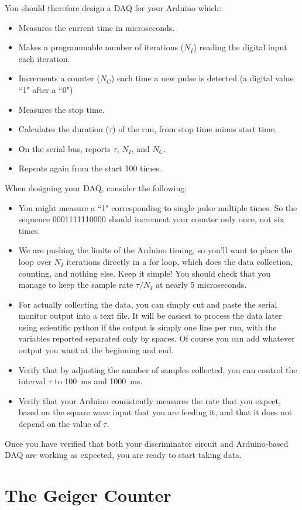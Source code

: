 \documentclass[12pt]{article}
\begin{document}
You should therefore design a DAQ for your Arduino which:
\begin{itemize}
\item Measures the current time in microseconds.
\item Makes a programmable number of iterations ($N_I$) reading the digital input each iteration.
\item Increments a counter ($N_C$) each time a new pulse is detected (a digital value ``1" after a ``0")
\item Measures the stop time.
\item Calculates the duration ($\tau$) of the run, from stop time minus start time.
\item On the serial bus, reports $\tau$, $N_I$, and $N_C$.
\item Repeats again from the start 100 times.
\end{itemize}
When designing your DAQ, consider the following:
\begin{itemize}
\item You might measure a ``1" corresponding to single pulse multiple times.  So the sequence 0001111110000 should increment your counter only once, not six times.
\item We are pushing the limits of the Arduino timing, so you'll want to place the loop over $N_I$ iterations directly in a for loop, which does the data collection, counting, and nothing else.  Keep it simple!  You should check that you manage to keep the sample rate $\tau / N_I$ at nearly 5 microseconds.
\item For actually collecting the data, you can simply cut and paste the serial monitor output into a text file.  It will be easiest to process the data later using scientific python if the output is simply one line per run, with the variables reported separated only by spaces.   Of course you can add whatever output you want at the beginning and end.
\item Verify that by adjusting the number of samples collected, you can control the interval $\tau$ to 100~ms and 1000~ms.
\item Verify that your Arduino consistently measures the rate that you expect, based on the square wave input that you are feeding it, and that it does not depend on the value of $\tau$.
\end{itemize}
Once you have verified that both your discriminator circuit and Arduino-based DAQ are working as expected, you are ready to start taking data.

\section{The Geiger Counter}
\end{document}
